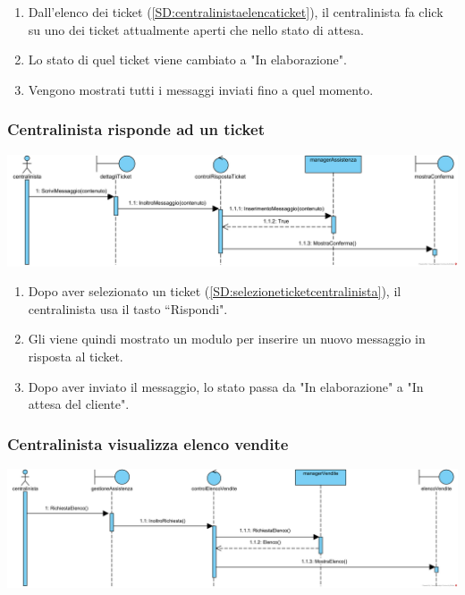 \documentclass[12pt,a4paper]{article}
\begin{document}
\begin{enumerate}
\item Dall'elenco dei ticket (\ref{SD:centralinistaelencaticket}), il centralinista fa click su uno dei ticket attualmente aperti che nello stato di attesa.
\item Lo stato di quel ticket viene cambiato a "In elaborazione".
\item Vengono mostrati tutti i messaggi inviati fino a quel momento.
\end{enumerate}

\newpage

\subsubsection{Centralinista risponde ad un ticket}
\label{SD:rispostaticketcentralinista}

\begin{center}
\includegraphics[width=\textwidth]{SequenceDiagram/CentralinistaTicketRisponde}
\end{center}

\begin{enumerate}
\item Dopo aver selezionato un ticket (\ref{SD:selezioneticketcentralinista}), il centralinista usa il tasto ``Rispondi".
\item Gli viene quindi mostrato un modulo per inserire un nuovo messaggio in risposta al ticket.
\item Dopo aver inviato il messaggio, lo stato passa da "In elaborazione" a "In attesa del cliente".
\end{enumerate}

\subsubsection{Centralinista visualizza elenco vendite}
\label{SD:elencovenditecentralinista}

\begin{center}
\includegraphics[width=\textwidth]{SequenceDiagram/CentralinistaVenditeElenco}
\end{center}
\end{document}
